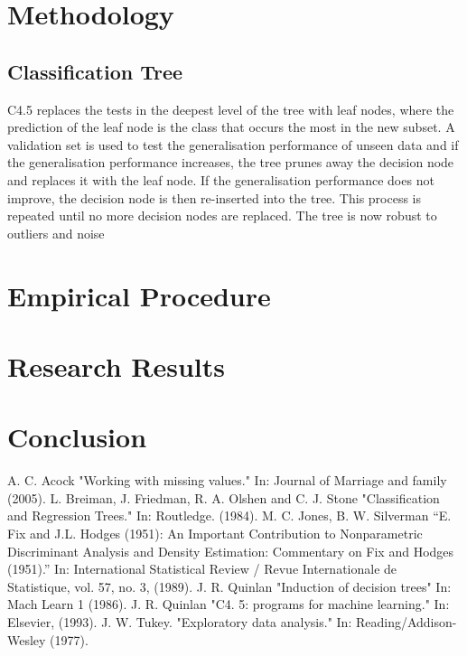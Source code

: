 \documentclass[10pt, conference]{IEEEtran}
\begin{document}
\section{Methodology}

\subsection{Classification Tree}

C4.5 replaces the tests in the deepest level of the tree with leaf nodes,
where the prediction of the leaf node is the class that occurs the most in the new subset.
A validation set is used to test the generalisation performance of unseen data and if the generalisation performance
increases, the tree prunes away the decision node and replaces it with the leaf node. If the generalisation performance
does not improve, the decision node is then re-inserted into the tree. This process is repeated until no more decision
nodes are replaced. The tree is now robust to outliers and noise 


\section{Empirical Procedure}
\section{Research Results}
\section{Conclusion}
\begin{thebibliography}{00}
     A. C. Acock "Working with missing values." In: Journal of Marriage and family (2005).
     L. Breiman, J. Friedman, R. A. Olshen and C. J. Stone "Classification and Regression Trees." In: Routledge.  (1984).
     M. C. Jones, B. W. Silverman “E. Fix and J.L. Hodges (1951): An Important Contribution to Nonparametric Discriminant Analysis and Density Estimation: Commentary on Fix and Hodges (1951).” In: International Statistical Review / Revue Internationale de Statistique, vol. 57, no. 3, (1989).
     J. R. Quinlan "Induction of decision trees" In: Mach Learn 1 (1986).
     J. R. Quinlan "C4. 5: programs for machine learning." In: Elsevier, (1993).
     J. W. Tukey. "Exploratory data analysis." In: Reading/Addison-Wesley (1977).
\end{thebibliography}
\end{document}
